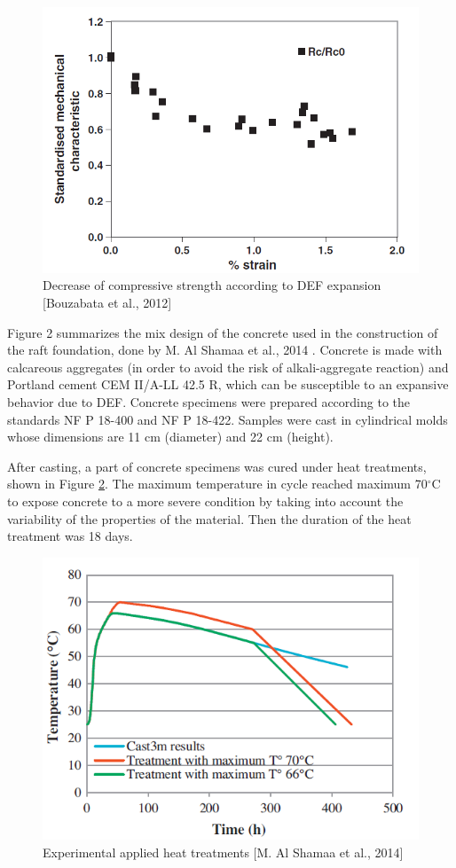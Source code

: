 \begin{figure}[h!]
  \centering
  \includegraphics[width=0.8\linewidth]{Reference/Bouzabata3.png}
  \caption{Decrease of compressive strength according to DEF expansion [Bouzabata et al., 2012\cite{Bouzabata}]}
  \label{Bouzabata (2012)3}
\end{figure}


\clearpage

Figure 2 summarizes the mix design of the concrete used in the construction of the raft foundation, done by M. Al Shamaa et al., 2014 \cite{Shamaa}. Concrete is made with calcareous
aggregates (in order to avoid the risk of alkali-aggregate reaction) and Portland cement CEM II/A-LL 42.5 R, which can be susceptible to an expansive behavior due to DEF. Concrete specimens were prepared according to the standards NF P 18-400 and NF P 18-422. Samples were cast in cylindrical molds whose dimensions are 11 cm (diameter) and 22 cm (height).

After casting, a part of concrete specimens was cured under heat treatments, shown in Figure \ref{Shamaa1}. The maximum temperature in cycle reached maximum 70$^\circ$C to expose concrete to a more severe condition by taking into account the variability of the properties of the material. Then the duration of the heat treatment was 18 days.

\begin{figure}[h!]
  \centering
  \includegraphics[width=0.8\linewidth]{Reference/Shamaa1.png}
  \caption{Experimental applied heat treatments [M. Al Shamaa et al., 2014\cite{Shamaa}]}
  \label{Shamaa1}
\end{figure}

